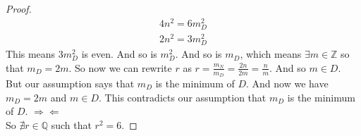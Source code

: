 \documentclass{article}
\newcommand{\contradiction}{\Rightarrow\!\Leftarrow}
\theoremstyle{claim}
\theoremstyle{definition}
\begin{document}
\begin{enumerate}
\begin{proof}
\begin{gather*}
                4n^2 = 6m_D^2\\
                2n^2 = 3m_D^2
            \end{gather*}
            This means $3m_D^2$ is even. And so is $m_D^2$. And so is $m_D$, which means $\exists m \in \mathbb{Z}$ so that $m_D = 2m$.
            So now we can rewrite $r$ as $r = \frac{m_N}{m_D} = \frac{2n}{2m} = \frac{n}{m}$. And so $m \in D$.\\
            But our assumption says that $m_D$ is the minimum of $D$. And now we have $m_D = 2m$ and $m \in D$. This contradicts our assumption that $m_D$ is the minimum of $D$. $\contradiction$\\
            So $\nexists r \in \mathbb{Q}$ such that $r^2 = 6$. 
        \end{proof}
\end{enumerate}
\end{document}
